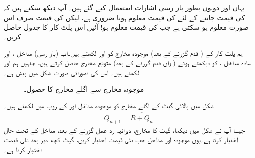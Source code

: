 یہاں  اور  دونوں بطور باز رسی اشارات استعمال کیے گئے ہیں۔ آپ دیکھ سکتے ہیں کہ  کی قیمت جاننے کے لئے  کی قیمت معلوم ہونا ضروری ہے، لیکن  کی قیمت صرف اس صورت معلوم ہو سکتی ہے جب  کی قیمت معلوم ہو! آئیں اس پلٹ کار کا جدول حاصل کریں۔

ہم پلٹ کار کے (  قدم گزرنے کے بعد) موجودہ مخارج کو  اور  لکھتے ہیں۔اب (باز رسی) مداخل
 ،  اور سادہ مداخل  ،  کو دیکھتے ہوئے (  واں قدم گزرنے کے بعد) متوقع مخارج حاصل کرتے ہیں، جنہیں ہم  اور  لکھتے ہیں۔ اس کی تصوراتی صورت
 شکل  میں پیش ہے۔

\begin{figure}
\centering
{}
\caption{موجودہ مخارج سے اگلے مخارج کا حصول۔}
\label{شکل_ترتیبی_اگلا_مخارج}
\end{figure}

شکل  میں بالائی گیٹ  کے اگلے مخارج  کو موجودہ مداخل  اور  کے روپ میں لکھتے ہیں۔
 \begin{align}\label{مساوات_ترتیبی_اگلا_کیو}
 Q_{n+1}=\overline{R+\overline{Q}_n}
 \end{align}
 جیسا آپ نے شکل  میں دیکھا، گیٹ کا مخارج، دورانیہ رد عمل گزرنے کے بعد، مداخل کے تحت حال اختیار کرتا ہے۔یوں موجودہ  اور مداخل  جب نئی قیمت اختیار کریں، گیٹ کچھ دیر بعد نئی قیمت  اختیار کرتا ہے۔
 
